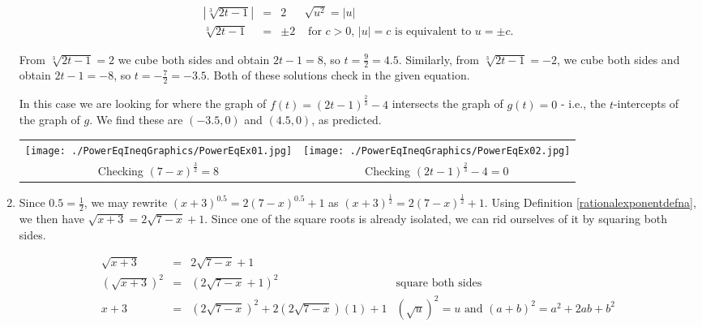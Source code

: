 \documentclass{ximera}
\begin{document}
\begin{example}
\begin{enumerate}
\[\begin{array}{rclr}
|\sqrt[3]{2t-1}| & = & 2 & \text{$\sqrt{u^2} = |u|$} \\

\sqrt[3]{2t-1} & = & \pm 2 & \text{ for $c>0$, $|u| = c$ is equivalent to $u = \pm c$.} \end{array} \]

From $\sqrt[3]{2t-1}  = 2$ we cube both sides and obtain $2t-1 = 8$, so $t = \frac{9}{2} = 4.5$.  Similarly, from $\sqrt[3]{2t-1}  = -2$, we cube both sides and obtain $2t-1 = -8$, so $t = -\frac{7}{2} = -3.5$.  Both of these solutions check in the given equation.

In this case we are looking for where the graph of $f(t) = (2t-1)^{\frac{2}{3}} -4$ intersects the graph of $g(t) = 0$ - i.e., the $t$-intercepts of the graph of $g$.  We find these are $(-3.5,0)$ and $(4.5,0)$, as predicted.

\begin{center}

\begin{tabular}{cc}

\texttt{[image: ./PowerEqIneqGraphics/PowerEqEx01.jpg]} & \texttt{[image: ./PowerEqIneqGraphics/PowerEqEx02.jpg]} \\

Checking $(7-x)^{\frac{3}{2}} = 8$  & Checking  $(2t-1)^{\frac{2}{3}} -4 = 0$ \\

\end{tabular}

\end{center} 

\item Since $0.5 = \frac{1}{2}$, we may rewrite $(x+3)^{0.5} = 2(7-x)^{0.5}+1$ as  $(x+3)^{\frac{1}{2}} = 2(7-x)^{\frac{1}{2}}+1$.  Using Definition \ref{rationalexponentdefna}, we then have $\sqrt{x+3} = 2\sqrt{7-x} + 1$.  Since one of the square roots is already isolated, we can rid ourselves of it by squaring both sides.

\[ \begin{array}{rclr}

\sqrt{x+3} & = & 2\sqrt{7-x} + 1 & \\

 (\sqrt{x+3})^2 & = & (2\sqrt{7-x} + 1)^2 & \text{square both sides} \\
 
 x+3 & = & (2 \sqrt{7-x})^2 + 2 (2 \sqrt{7-x})(1) + 1 & \text{$(\sqrt{u})^2 = u$ and $(a+b)^2 = a^2 + 2ab +b^2$} \\


\end{array}\]
\end{enumerate}
\end{example}
\end{document}
